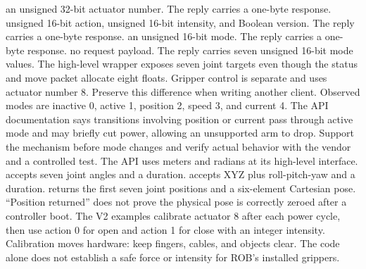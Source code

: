 \markdownRendererUlItem {} an unsigned 32-bit actuator number. The reply carries a one-byte response.\markdownRendererUlItemEnd 
\markdownRendererUlItem {} unsigned 16-bit action, unsigned 16-bit intensity, and Boolean version. The reply carries a one-byte response.\markdownRendererUlItemEnd 
\markdownRendererUlItem {} an unsigned 16-bit mode. The reply carries a one-byte response.\markdownRendererUlItemEnd 
\markdownRendererUlItem {} no request payload. The reply carries seven unsigned 16-bit mode values.\markdownRendererUlItemEnd 
\markdownRendererUlEnd \markdownRendererInterblockSeparator
{}The high-level wrapper exposes seven joint targets even though the status and move packet allocate eight floats. Gripper control is separate and uses actuator number 8. Preserve this difference when writing another client.\markdownRendererParagraphSeparator
{}Observed modes are inactive 0, active 1, position 2, speed 3, and current 4. The API documentation says transitions involving position or current pass through active mode and may briefly cut power, allowing an unsupported arm to drop. Support the mechanism before mode changes and verify actual behavior with the vendor and a controlled test.\markdownRendererParagraphSeparator
{}The API uses meters and radians at its high-level interface.  accepts seven joint angles and a duration.  accepts XYZ plus roll-pitch-yaw and a duration.  returns the first seven joint positions and a six-element Cartesian pose. “Position returned” does not prove the physical pose is correctly zeroed after a controller boot.\markdownRendererInterblockSeparator
{}
\markdownRendererSectionEnd \markdownRendererSectionBegin
{}\markdownRendererInterblockSeparator
{}The V2 examples calibrate actuator 8 after each power cycle, then use action 0 for open and action 1 for close with an integer intensity. Calibration moves hardware: keep fingers, cables, and objects clear. The code alone does not establish a safe force or intensity for ROB's installed grippers.\markdownRendererInterblockSeparator
{}
\markdownRendererSectionEnd \markdownRendererSectionBegin
{}\markdownRendererInterblockSeparator
